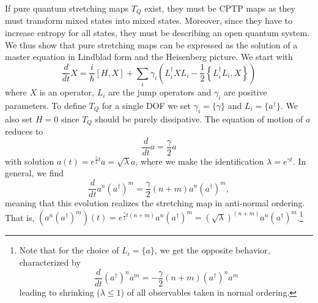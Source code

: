 \documentclass{article}
\begin{document}
If pure quantum stretching maps $T_Q$ exist, they must be CPTP maps as they must transform mixed states into mixed states. Moreover, since they have to increase entropy for all states, they must be describing an open quantum system. We thus show that pure stretching maps can be expressed as the solution of a master equation in Lindblad form and the Heisenberg picture. We start with
\begin{equation}
	\frac{d}{d t} X=\frac{i}{\hbar}[H,X]+\sum_i \gamma_i \left(L_i^\dagger X L_i-\frac{1}{2}\left\{L_i^\dagger L_i,X\right\}\right)
\end{equation}
where $X$ is an operator, $L_i$ are the jump operators and $\gamma_i$ are positive parameters. To define $T_Q$ for a single DOF we set $\gamma_i=\{\gamma\}$ and $L_i=\{a^\dagger\}$. We also set $H=0$ since $T_Q$ should be purely dissipative. The equation of motion of $a$ reduces to
\begin{equation}
	\frac{d}{d t} a=\frac{\gamma}{2} a
\end{equation}
with solution $a(t)=e^{\frac{\gamma}{2} t} a = \sqrt{\lambda} a$, where we make the identification $\lambda=e^{\gamma t}$. 
In general, we find
\begin{equation}
	\frac{d}{d t} a^n (a^{\dagger})^m=\frac{\gamma}{2}(n+m)a^n (a^{\dagger})^m,
\end{equation}
meaning that this evolution realizes the stretching map in anti-normal ordering. That is, $(a^n (a^{\dagger})^m)(t)=e^{\frac{\gamma}{2} t (n+m)} a^n (a^{\dagger})^m = (\sqrt{\lambda})^{(n+m)} a^n (a^{\dagger})^m$.\footnote{Note that for the choice of $L_i=\{a\}$, we get the opposite behavior, characterized by
\begin{equation}
	\frac{d}{d t} (a^{\dagger})^n a^m=-\frac{\gamma}{2}(n+m)(a^{\dagger})^n a^m
\end{equation}
leading to shrinking ($\lambda\leq1$) of all observables taken in normal ordering.}
\end{document}
